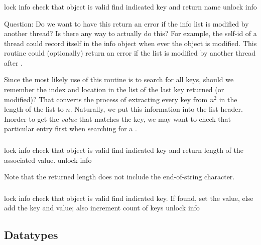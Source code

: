 \documentclass{article}
\begin{document}
\subsubsection{}
\begin{algorithm}
lock info
check that object is valid
find indicated key and return name
unlock info
\end{algorithm}

Question:  Do we want to have this return an error if the info list is 
modified by another thread?  Is there any way to actually do this?  For
example, the self-id of a thread could record itself in the info object when
ever the object is modified.  This routine could (optionally) return an error
if the list is modified by another thread after .

Since the most likely use of this routine is to search for all keys,
should we remember the index and location in the list of the last key
returned (or modified)?  That converts the process of extracting every
key from $n^2$ in the length of the list to $n$.  Naturally, we put
this information into the list header.  Inorder to get the
\emph{value} that matches the key, we may want to check that
particular entry first when searching for a .

\subsubsection{}
\begin{algorithm}
lock info
check that object is valid
find indicated key and return length of the associated value.
unlock info
\end{algorithm}
Note that the returned length does not include the end-of-string character.

\subsubsection{}
\begin{algorithm}
lock info
check that object is valid
find indicated key.  
If found, set the value,
else add the key and value; also increment count of keys
unlock info
\end{algorithm}


\subsection{Datatypes}
\label{sec:datatypes}
\end{document}
